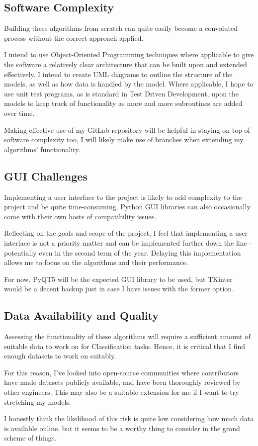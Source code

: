 \documentclass[report,10pt]{article}
\begin{document}
\subsection{Software Complexity}
Building these algorithms from scratch can quite easily become a convoluted process without the correct approach applied. \par
I intend to use Object-Oriented Programming techniques where applicable to give the software a relatively clear architecture that can be built upon and extended effectively. I intend to create UML diagrams to outline the structure of the models, as well as how data is handled by the model. Where applicable, I hope to use unit test programs, as is standard in Test Driven Development, upon the models to keep track of functionality as more and more subroutines are added over time. \par
Making effective use of my GitLab repository will be helpful in staying on top of software complexity too, I will likely make use of branches when extending my algorithms' functionality. \par
\subsection{GUI Challenges}
Implementing a user interface to the project is likely to add complexity to the project and be quite time-consuming. Python GUI libraries can also occasionally come with their own hosts of compatibility issues. \par
Reflecting on the goals and scope of the project, I feel that implementing a user interface is not a priority matter and can be implemented further down the line - potentially even in the second term of the year. Delaying this implementation allows me to focus on the algorithms and their performance. \par
For now, PyQT5 will be the expected GUI library to be used, but TKinter~\cite{tkinter} would be a decent backup just in case I have issues with the former option.
\subsection{Data Availability and Quality}
Assessing the functionality of these algorithms will require a sufficient amount of suitable data to work on for Classification tasks. Hence, it is critical that I find enough datasets to work on suitably. \par
For this reason, I've looked into open-source communities where contributors have made datasets publicly available, and have been thoroughly reviewed by other engineers. This may also be a suitable extension for me if I want to try stretching my models. \par
I honestly think the likelihood of this risk is quite low considering how much data is available online, but it seems to be a worthy thing to consider in the grand scheme of things. \par
\end{document}
